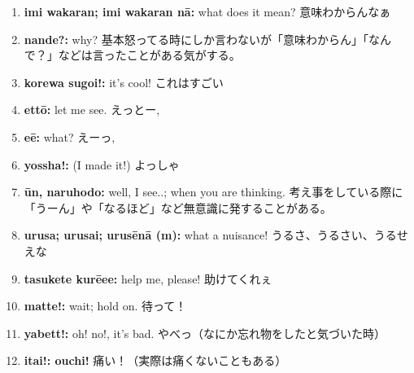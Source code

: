 \documentclass[uplatex,dvipdfmx,b5paper,english,10pt]{jsbook}
\begin{document}
\begin{enumerate}
 \itemsep=-1pt
 \item \ifEnglish
       {\bfseries imi wakaran; imi wakaran n\=a:} what does it mean?
       \else
       意味わからんなぁ
       \fi
 \item \ifEnglish
       {\bfseries nande?:} why?
       \else
       基本怒ってる時にしか言わないが「意味わからん」「なんで？」などは言ったことがある気がする。
       \fi
 \item \ifEnglish
       {\bfseries korewa sugoi!:} it's cool!
       \else
       これはすごい
       \fi
 \item \ifEnglish
       {\bfseries ett\=o:} let me see.
       \else
       えっとー,
       \fi
 \item \ifEnglish
       {\bfseries e\=e:} what?
       \else
       えーっ,
       \fi
 \item \ifEnglish
       {\bfseries yossha!:} (I made it!)
       \else
       よっしゃ
       \fi
\item \ifEnglish
      {\bfseries \=un, naruhodo:} well, I see..; when you are thinking.
      \else
      考え事をしている際に「うーん」や「なるほど」など無意識に発することがある。
      \fi
 \item \ifEnglish
       {\bfseries urusa; urusai; urus\=en\=a (m):} what a nuisance!
       \else
       うるさ、うるさい、うるせえな
       \fi
 \item \ifEnglish
       {\bfseries tasukete kur\=eee:} help me, please!
       \else
       助けてくれぇ
       \fi
 \item \ifEnglish
       {\bfseries matte!:} wait; hold on.
       \else
       待って！
       \fi
 \item \ifEnglish
       {\bfseries yabett!: } oh! no!, it's bad.
       \else
       やべっ（なにか忘れ物をしたと気づいた時）
       \fi
 \item \ifEnglish
       {\bfseries itai!: ouchi!}
       \else
       痛い！（実際は痛くないこともある）
       \fi

\end{enumerate}
\end{document}
